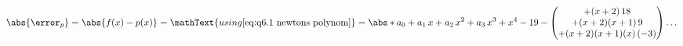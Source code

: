 \documentclass["CN_A-Tests_Resolutions.tex"]{subfiles}
\begin{document}
\begin{questionBox}
\begin{questionBox}

    \begin{tcolorbox}
      \begin{gather}
        \abs{\error_{p}}
        = \abs{
          f(x)
          - p(x)
        }
        = \mathText{using \eqref{eq:q6.1 newtons polynom}}
        = \abs*{
          a_0 + a_1\,x + a_2\,x^2 + a_3\,x^3 + x^4
          - 19
          - \begin{pmatrix}
            + (x+2)\,18
            \\
            + (x+2)(x+1)\,9
            \\
            + (x+2)(x+1)(x)\,(-3)
          \end{pmatrix}
        }
        \dots
      \end{gather}
    \end{tcolorbox}
  \end{questionBox}


\end{questionBox}
\end{document}
